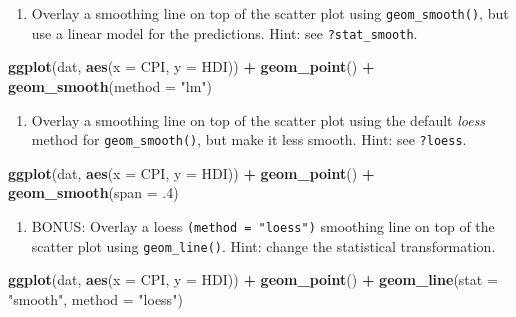 \documentclass[]{book}
\newenvironment{Shaded}{\begin{snugshade}}{\end{snugshade}}
\newcommand{\DataTypeTok}[1]{\textcolor[rgb]{0.13,0.29,0.53}{#1}}
\newcommand{\FloatTok}[1]{\textcolor[rgb]{0.00,0.00,0.81}{#1}}
\newcommand{\KeywordTok}[1]{\textcolor[rgb]{0.13,0.29,0.53}{\textbf{#1}}}
\newcommand{\NormalTok}[1]{#1}
\newcommand{\OperatorTok}[1]{\textcolor[rgb]{0.81,0.36,0.00}{\textbf{#1}}}
\newcommand{\StringTok}[1]{\textcolor[rgb]{0.31,0.60,0.02}{#1}}
\providecommand{\tightlist}{%
  \setlength{\itemsep}{0pt}\setlength{\parskip}{0pt}}
\begin{document}
\begin{enumerate}
\def\labelenumi{\arabic{enumi}.}
\setcounter{enumi}{2}
\tightlist
\item
  Overlay a smoothing line on top of the scatter plot using \texttt{geom\_smooth()}, but use a linear model for the predictions. Hint: see \texttt{?stat\_smooth}.
\end{enumerate}

\begin{Shaded}
\begin{Highlighting}[]
\KeywordTok{ggplot}\NormalTok{(dat, }\KeywordTok{aes}\NormalTok{(}\DataTypeTok{x =}\NormalTok{ CPI, }\DataTypeTok{y =}\NormalTok{ HDI)) }\OperatorTok{+}
\StringTok{  }\KeywordTok{geom_point}\NormalTok{() }\OperatorTok{+}
\StringTok{  }\KeywordTok{geom_smooth}\NormalTok{(}\DataTypeTok{method =} \StringTok{"lm"}\NormalTok{)}
\end{Highlighting}
\end{Shaded}

\begin{enumerate}
\def\labelenumi{\arabic{enumi}.}
\setcounter{enumi}{3}
\tightlist
\item
  Overlay a smoothing line on top of the scatter plot using the default \emph{loess} method for \texttt{geom\_smooth()}, but make it less smooth. Hint: see \texttt{?loess}.
\end{enumerate}

\begin{Shaded}
\begin{Highlighting}[]
\KeywordTok{ggplot}\NormalTok{(dat, }\KeywordTok{aes}\NormalTok{(}\DataTypeTok{x =}\NormalTok{ CPI, }\DataTypeTok{y =}\NormalTok{ HDI)) }\OperatorTok{+}
\StringTok{  }\KeywordTok{geom_point}\NormalTok{() }\OperatorTok{+}
\StringTok{  }\KeywordTok{geom_smooth}\NormalTok{(}\DataTypeTok{span =} \FloatTok{.4}\NormalTok{)}
\end{Highlighting}
\end{Shaded}

\begin{enumerate}
\def\labelenumi{\arabic{enumi}.}
\setcounter{enumi}{4}
\tightlist
\item
  BONUS: Overlay a loess \texttt{(method\ =\ "loess")} smoothing line on top of the scatter plot using \texttt{geom\_line()}. Hint: change the statistical transformation.
\end{enumerate}

\begin{Shaded}
\begin{Highlighting}[]
\KeywordTok{ggplot}\NormalTok{(dat, }\KeywordTok{aes}\NormalTok{(}\DataTypeTok{x =}\NormalTok{ CPI, }\DataTypeTok{y =}\NormalTok{ HDI)) }\OperatorTok{+}
\StringTok{  }\KeywordTok{geom_point}\NormalTok{() }\OperatorTok{+}
\StringTok{  }\KeywordTok{geom_line}\NormalTok{(}\DataTypeTok{stat =} \StringTok{"smooth"}\NormalTok{, }\DataTypeTok{method =} \StringTok{"loess"}\NormalTok{)}
\end{Highlighting}
\end{Shaded}
\end{document}
